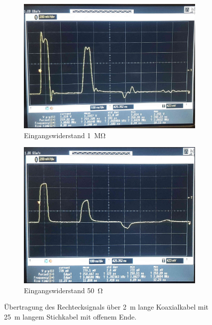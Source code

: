 \documentclass[a4paper,twoside,final]{article}
\begin{document}
\begin{figure}[htp]
    \centering
    \begin{subfigure}{0.45\textwidth}
        \includegraphics[width=\textwidth]{Bilder/Bild3.jpg}
        \caption{Eingangswiderstand \SI{1}{\mega\ohm}}
    \end{subfigure}\hspace{1cm}
    \begin{subfigure}{0.45\textwidth}
        \includegraphics[width=\textwidth]{Bilder/Bild4.jpg}
        \caption{Eingangswiderstand \SI{50}{\ohm}}
    \end{subfigure}
    \caption{Übertragung des Rechtecksignals über \SI{2}{\metre} lange Koaxialkabel mit \SI{25}{\metre} langem Stichkabel mit offenem Ende.}
\end{figure}\\
\end{document}
